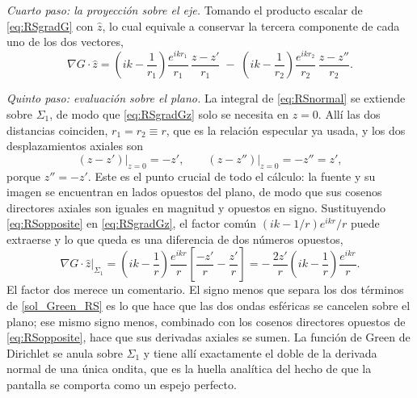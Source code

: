 		\textit{Cuarto paso: la proyección sobre el eje.} Tomando el producto escalar de \eqref{eq:RSgradG} con $\hat{z}$, lo cual equivale a conservar la tercera componente de cada uno de los dos vectores,
		\begin{equation}\label{eq:RSgradGz}
			\nabla G\cdot\hat{z} = \left(ik-\dfrac{1}{r_{1}}\right)\dfrac{e^{ikr_{1}}}{r_{1}}\,\dfrac{z-z'}{r_{1}} \;-\; \left(ik-\dfrac{1}{r_{2}}\right)\dfrac{e^{ikr_{2}}}{r_{2}}\,\dfrac{z-z''}{r_{2}} .
		\end{equation}

		\textit{Quinto paso: evaluación sobre el plano.} La integral de \eqref{eq:RSnormal} se extiende sobre $\Sigma_{1}$, de modo que \eqref{eq:RSgradGz} solo se necesita en $z=0$. Allí las dos distancias coinciden, $r_{1} = r_{2} \equiv r$, que es la relación especular ya usada, y los dos desplazamientos axiales son
		\begin{equation}\label{eq:RSopposite}
			\left.\left(z-z'\right)\right|_{z=0} = -z', \qquad \left.\left(z-z''\right)\right|_{z=0} = -z'' = z' ,
		\end{equation}
		porque $z'' = -z'$. Este es el punto crucial de todo el cálculo: la fuente y su imagen se encuentran en lados opuestos del plano, de modo que sus cosenos directores axiales son iguales en magnitud y opuestos en signo. Sustituyendo \eqref{eq:RSopposite} en \eqref{eq:RSgradGz}, el factor común $\left(ik-1/r\right)e^{ikr}/r$ puede extraerse y lo que queda es una diferencia de dos números opuestos,
		\begin{equation}\label{eq:RSgradGplane}
			\left.\nabla G\cdot\hat{z}\right|_{\Sigma_{1}} = \left(ik-\dfrac{1}{r}\right)\dfrac{e^{ikr}}{r}\left[\dfrac{-z'}{r} - \dfrac{z'}{r}\right] = -\,\dfrac{2z'}{r}\left(ik-\dfrac{1}{r}\right)\dfrac{e^{ikr}}{r} .
		\end{equation}
		El factor dos merece un comentario. El signo menos que separa los dos términos de \eqref{sol_Green_RS} es lo que hace que las dos ondas esféricas se cancelen sobre el plano; ese mismo signo menos, combinado con los cosenos directores opuestos de \eqref{eq:RSopposite}, hace que sus derivadas axiales se sumen. La función de Green de Dirichlet se anula sobre $\Sigma_{1}$ y tiene allí exactamente el doble de la derivada normal de una única ondita, que es la huella analítica del hecho de que la pantalla se comporta como un espejo perfecto.

